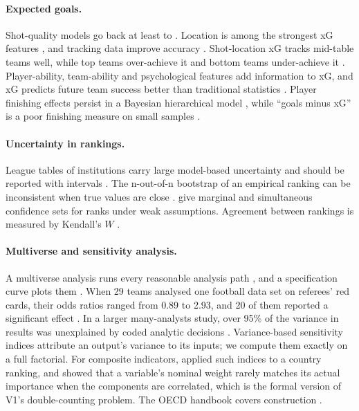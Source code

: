 \documentclass[11pt,a4paper]{article}
\begin{document}
\paragraph{Expected goals.}
Shot-quality models go back at least to \citet{pollard1997strategies}.
Location is among the strongest xG features \citep{robberechts2020xg}, and
tracking data improve accuracy \citep{anzer2021xg}. Shot-location xG tracks
mid-table teams well, while top teams over-achieve it and bottom teams
under-achieve it \citep{rathke2017xg}. Player-ability, team-ability
and psychological features add information to xG, and xG predicts future team
success better than traditional statistics \citep{mead2023xg}. Player finishing effects
persist in a Bayesian hierarchical model \citep{scholtes2024bayesxg}, while
``goals minus xG'' is a poor finishing measure on small samples
\citep[preprint;][]{davis2024finishing}.

\paragraph{Uncertainty in rankings.}
League tables of institutions carry large model-based uncertainty and should
be reported with intervals \citep{goldstein1996league}. The n-out-of-n
bootstrap of an empirical ranking can be inconsistent when true values are
close \citep{hall2009bootstrap}. \citet{mogstad2024ranks} give marginal and
simultaneous confidence sets for ranks under weak assumptions. Agreement
between rankings is measured by Kendall's $W$ \citep{kendall1939rankings}.

\paragraph{Multiverse and sensitivity analysis.}
A multiverse analysis runs every reasonable analysis path
\citep{steegen2016multiverse}, and a specification curve plots them
\citep{simonsohn2020specification}. When 29 teams analysed one football data
set on referees' red cards, their odds ratios ranged from 0.89 to 2.93, and 20
of them reported a significant effect \citep{silberzahn2018many}. In a larger
many-analysts study, over 95\% of the variance in results was unexplained by
coded analytic decisions \citep{breznau2022many}. Variance-based sensitivity
indices \citep{sobol2001sensitivity,homma1996importance,saltelli2002sensitivity,saltelli2010total,saltelli2008primer}
attribute an output's variance to its inputs; we compute them exactly on a
full factorial. For composite indicators, \citet{saisana2005composite} applied
such indices to a country ranking, and \citet{paruolo2013voodoo} showed that a
variable's nominal weight rarely matches its actual importance when the
components are correlated, which is the formal version of V1's double-counting
problem. The OECD handbook covers construction \citep{oecd2008composite}.
\end{document}
